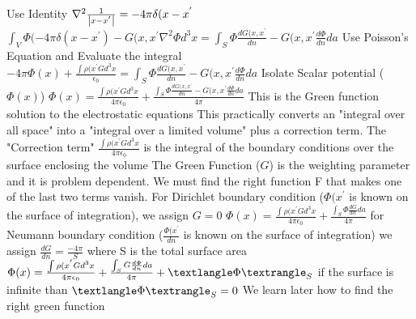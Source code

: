 \documentclass[12pt]{article}
\begin{document}
\newline Use Identity $\nabla^2 \frac{1}{\abs{x-x^{'}}} = -4 \pi \delta(x-x^{'}$
\newline $\int_V \Phi (-4 \pi \delta(x-x^{'}) - G(x,x^{'} \nabla^2 \Phi d^3x = \int_S \Phi \frac{dG(x,x^{'}}{dn} - G(x,x^{'} \frac{d\Phi}{dn} da$
\newline Use Poisson's Equation and Evaluate the integral
\newline $-4 \pi \Phi(x) + \frac{\int \rho(x^{'} G d^3x}{\epsilon_0} = \int_S \Phi \frac{dG(x,x^{'}}{dn} - G(x,x^{'} \frac{d\Phi}{dn} da$
\newline Isolate Scalar potential ($\Phi(x)$)
\newline $\Phi(x) = \frac{\int \rho(x^{'} G d^3x}{4 \pi \epsilon_0} + \frac{\int_S \Phi \frac{dG(x,x^{'}}{dn} - G(x,x^{'} \frac{d\Phi}{dn} da}{4 \pi}$
\newline This is the Green function solution to the electrostatic equations
\newline This practically converts an "integral over all space" into a "integral over a limited volume" plus a correction term. 
\newline The "Correction term" $\frac{\int \rho(x^{'} G d^3x}{4 \pi \epsilon_0}$ is the integral of the boundary conditions over the surface enclosing the volume
\newline The Green Function ($G$) is the weighting parameter and it is problem dependent. We must find the right function F that makes one of the last two terms vanish. 
\newline For Dirichlet boundary condition ($\Phi(x^{'}$ is known on the surface of integration), we assign $G = 0$
\newline $\Phi(x) = \frac{\int \rho(x^{'} G d^3x}{4 \pi \epsilon_0} + \frac{\int_S \Phi \frac{dG}{dn} da}{4 \pi}$
\newline for Neumann boundary condition ($\frac{\Phi(x^{'}}{dn}$ is known on the surface of integration) we assign $\frac{dG}{dn} = \frac{-4 \pi}{S}$ where S is the total surface area
\newline $\Phi(x) = \frac{\int \rho(x^{'} G d^3x}{4 \pi \epsilon_0} + \frac{\int_S G \frac{d\Phi}{dn} da}{4 \pi} + \textlangle \Phi \textrangle_S $
\newline if the surface is infinite than $\textlangle \Phi \textrangle_S = 0$
\newline We learn later how to find the right green function
\end{document}
